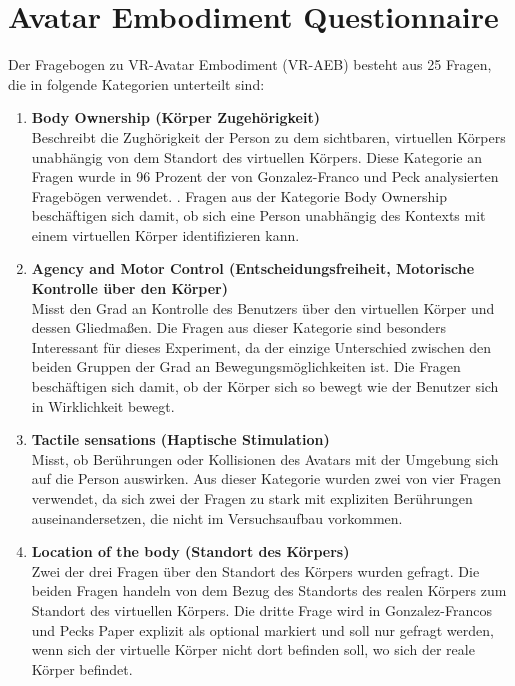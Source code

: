 \section{Avatar Embodiment Questionnaire}
Der Fragebogen zu VR-Avatar Embodiment (VR-AEB) besteht aus 25 Fragen, die in folgende Kategorien unterteilt sind:
\begin{enumerate} 

\item \textbf{Body Ownership (Körper Zugehörigkeit)}\\
Beschreibt die Zughörigkeit der Person zu dem sichtbaren, virtuellen Körpers unabhängig von dem Standort des virtuellen Körpers. Diese Kategorie an Fragen wurde in 96 Prozent der von Gonzalez-Franco und Peck analysierten Fragebögen verwendet. \cite{Gonzalez-Franco2018}. Fragen aus der Kategorie Body Ownership beschäftigen sich damit, ob sich eine Person unabhängig des Kontexts mit einem virtuellen Körper identifizieren kann.

\item\textbf{Agency and Motor Control (Entscheidungsfreiheit, Motorische Kontrolle über den Körper)}\\
Misst den Grad an Kontrolle des Benutzers über den virtuellen Körper und dessen Gliedmaßen. Die Fragen aus dieser Kategorie sind besonders Interessant für dieses Experiment, da der einzige Unterschied zwischen den beiden Gruppen der Grad an Bewegungsmöglichkeiten ist. Die Fragen beschäftigen sich damit, ob der Körper sich so bewegt wie der Benutzer sich in Wirklichkeit bewegt.

\item\textbf{Tactile sensations (Haptische Stimulation)}\\
Misst, ob Berührungen oder Kollisionen des Avatars mit der Umgebung sich auf die Person auswirken. Aus dieser Kategorie wurden zwei von vier Fragen verwendet, da sich zwei der Fragen zu stark mit expliziten Berührungen auseinandersetzen, die nicht im Versuchsaufbau vorkommen.

\item\textbf{Location of the body (Standort des Körpers)}\\
Zwei der drei Fragen über den Standort des Körpers wurden gefragt. Die beiden Fragen handeln von dem Bezug des Standorts des realen Körpers zum Standort des virtuellen Körpers. Die dritte Frage wird in Gonzalez-Francos und Pecks Paper explizit als optional markiert und soll nur gefragt werden, wenn sich der virtuelle Körper nicht dort befinden soll, wo sich der reale Körper befindet.


\end{enumerate}
